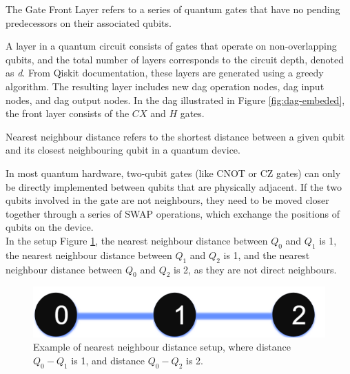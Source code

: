 \begin{definition}
    The Gate Front Layer refers to a series of quantum gates that have no pending predecessors on their associated qubits.
\end{definition}
A layer in a quantum circuit consists of gates that operate on non-overlapping qubits, and the total number of layers corresponds to the circuit depth, denoted as \textit{d}. From Qiskit documentation, these layers are generated using a greedy algorithm. The resulting layer includes new \acrshort{dag} operation nodes, \acrshort{dag} input nodes, and \acrshort{dag} output nodes. In the \acrshort{dag} illustrated in Figure \ref{fig:dag-embeded}, the front layer consists of the $CX$ and $H$ gates.

\begin{definition} %
    Nearest neighbour distance refers to the shortest distance between a given qubit and its closest neighbouring qubit in a quantum device. 
\end{definition}
In most quantum hardware, two-qubit gates (like CNOT or CZ gates) can only be directly implemented between qubits that are physically adjacent. If the two qubits involved in the gate are not neighbours, they need to be moved closer together through a series of SWAP operations, which exchange the positions of qubits on the device. \\
In the setup Figure \ref{fig:nearest-neighbour-distance}, the nearest neighbour distance between $Q_0$ and $Q_1$ is 1, the nearest neighbour distance between $Q_1$ and $Q_2$ is 1, and the nearest neighbour distance between $Q_0$ and $Q_2$ is 2, as they are not direct neighbours.
\begin{figure}[htb]
    \centering
    \includegraphics[width=0.25\linewidth]{image/nearest_neighbour_distance.png}
    \caption{Example of nearest neighbour distance setup, where distance $Q_0 - Q_1$ is 1, and distance $Q_0 - Q_2$ is 2.}
    \label{fig:nearest-neighbour-distance}
\end{figure}

